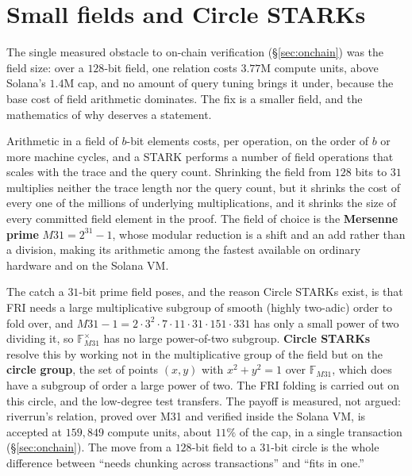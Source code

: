 \documentclass[11pt]{article}
\begin{document}
\section{Small fields and Circle STARKs}
\label{sec:math-m31}

The single measured obstacle to on-chain verification (\S\ref{sec:onchain}) was the field
size: over a $128$-bit field, one relation costs $3.77$M compute units, above Solana's
$1.4$M cap, and no amount of query tuning brings it under, because the base cost of field
arithmetic dominates. The fix is a smaller field, and the mathematics of why deserves a
statement.

Arithmetic in a field of $b$-bit elements costs, per operation, on the order of $b$ or
more machine cycles, and a STARK performs a number of field operations that scales with
the trace and the query count. Shrinking the field from $128$ bits to $31$ multiplies
neither the trace length nor the query count, but it shrinks the cost of every one of the
millions of underlying multiplications, and it shrinks the size of every committed field
element in the proof. The field of choice is the \textbf{Mersenne prime}
$M31 = 2^{31} - 1$, whose modular reduction is a shift and an add rather than a division,
making its arithmetic among the fastest available on ordinary hardware and on the Solana
VM.

The catch a $31$-bit prime field poses, and the reason Circle STARKs exist, is that FRI
needs a large multiplicative subgroup of smooth (highly two-adic) order to fold over, and
$M31 - 1 = 2 \cdot 3^2 \cdot 7 \cdot 11 \cdot 31 \cdot 151 \cdot 331$ has only a small
power of two dividing it, so $\mathbb{F}_{M31}^{\times}$ has no large power-of-two
subgroup. \textbf{Circle STARKs} \cite{stwo} resolve this by working not in the
multiplicative group of the field but on the \textbf{circle group}, the set of points
$(x, y)$ with $x^2 + y^2 = 1$ over $\mathbb{F}_{M31}$, which does have a subgroup of order
a large power of two. The FRI folding is carried out on this circle, and the low-degree
test transfers. The payoff is measured, not argued: riverrun's relation, proved over M31
and verified inside the Solana VM, is accepted at $159{,}849$ compute units, about $11\%$
of the cap, in a single transaction (\S\ref{sec:onchain}). The move from a $128$-bit field
to a $31$-bit circle is the whole difference between ``needs chunking across
transactions'' and ``fits in one.''

\end{document}
